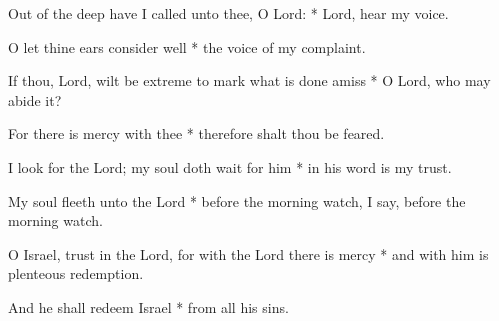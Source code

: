 \begin{multicols}{2}
	
	Out of the deep have I called unto thee, O Lord: * Lord, hear my voice.
	
	O let thine ears consider well * the voice of my complaint.
	
	If thou, Lord, wilt be extreme to mark what is done amiss * O Lord, who may abide it?
	
	For there is mercy with thee * therefore shalt thou be feared.
	
	I look for the Lord; my soul doth wait for him * in his word is my trust.
	
	My soul fleeth unto the Lord * before the morning watch, I say, before the morning watch.
	
	O Israel, trust in the Lord, for with the Lord there is mercy * and with him is plenteous redemption.
	
	And he shall redeem Israel * from all his sins.
	
	\gloria{}
\end{multicols}